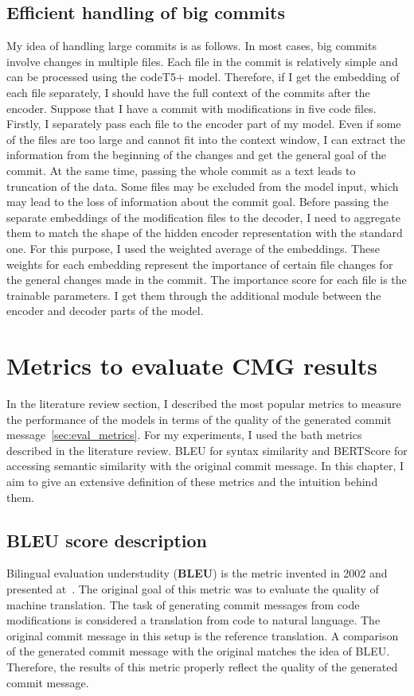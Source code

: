 \subsection{Efficient handling of big commits}\label{sec:efficient_handling_big}
My idea of handling large commits is as follows. In most cases, big commits involve changes in multiple files. Each file in the commit is relatively simple and can be processed using the codeT5+ model. Therefore, if I get the embedding of each file separately, I should have the full context of the commits after the encoder. Suppose that I have a commit with modifications in five code files. Firstly, I separately pass each file to the encoder part of my model. Even if some of the files are too large and cannot fit into the context window, I can extract the information from the beginning of the changes and get the general goal of the commit. At the same time, passing the whole commit as a text leads to truncation of the data. Some files may be excluded from the model input, which may lead to the loss of information about the commit goal. Before passing the separate embeddings of the modification files to the decoder, I need to aggregate them to match the shape of the hidden encoder representation with the standard one. For this purpose, I used the weighted average of the embeddings. These weights for each embedding represent the importance of certain file changes for the general changes made in the commit. The importance score for each file is the trainable parameters. I get them through the additional module between the encoder and decoder parts of the model.

\section{Metrics to evaluate CMG results}\label{sec:metrics_to_eval}
In the literature review section, I described the most popular metrics to measure the performance of the models in terms of the quality of the generated commit message~\ref{sec:eval_metrics}. For my experiments, I used the bath metrics described in the literature review. BLEU for syntax similarity and BERTScore for accessing semantic similarity with the original commit message. In this chapter, I aim to give an extensive definition of these metrics and the intuition behind them.

\subsection{BLEU score description}\label{subsec:bleu}
Bilingual evaluation understudity (\textbf{BLEU}) is the metric invented in 2002 and presented at~\cite{papineni2002bleu}. The original goal of this metric was to evaluate the quality of machine translation. The task of generating commit messages from code modifications is considered a translation from code to natural language. The original commit message in this setup is the reference translation. A comparison of the generated commit message with the original matches the idea of BLEU. Therefore, the results of this metric properly reflect the quality of the generated commit message. 

